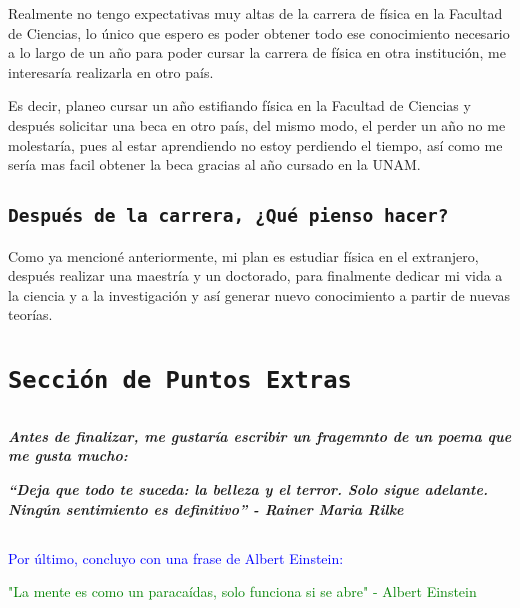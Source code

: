 \documentclass[12pt, letterpaper]{article}
\begin{document}
    \small{
    Realmente no tengo expectativas muy altas de la carrera de física en la Facultad de Ciencias, lo único que espero es poder obtener todo ese conocimiento necesario a lo largo de un año para poder cursar la carrera de física en otra institución, me interesaría realizarla en otro país. 
    
    Es decir, planeo cursar un año estifiando física en la Facultad de Ciencias y después solicitar una beca en otro país, del mismo modo, el perder un año no me molestaría, pues al estar aprendiendo no estoy perdiendo el tiempo, así como me sería mas facil obtener la beca gracias al año cursado en la UNAM.
    }
    
    \subsection{\tt{\large{Después de la carrera, ¿Qué pienso hacer?}}}

    \small{
    Como ya mencioné anteriormente, mi plan es estudiar física en el extranjero, después realizar una maestría y un doctorado, para finalmente dedicar mi vida a la ciencia y a la investigación y así generar nuevo conocimiento a partir de nuevas teorías.
    }
    
\section{\tt{\LARGE{Sección de Puntos Extras}}}

    \subsection{}
    
    
    \textit{\textbf{Antes de finalizar, me gustaría escribir un fragemnto de un poema que me gusta mucho:\\}}
    
    \textit{\textbf{“Deja que todo te suceda: la belleza y el terror. Solo sigue adelante. Ningún sentimiento es definitivo” - Rainer Maria Rilke}}
    
     
    \subsection{}
    

    {\textcolor{blue}{Por último, concluyo con una frase de Albert Einstein: }}
    
    {\textcolor{green}{"La mente es como un paracaídas, solo funciona si se abre" - Albert Einstein}}
    
\end{document}
